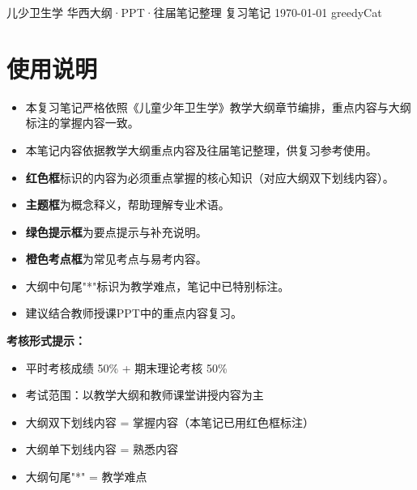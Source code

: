 \documentclass[10pt,a4paper,oneside]{ctexbook}
\begin{document}
\makecover
  {儿少卫生学}
  {华西大纲·PPT·往届笔记整理}
  {复习笔记}
  {\today}
  {greedyCat}

\tableofcontents

\chapter*{使用说明}

\begin{itemize}[leftmargin=*]
    \item 本复习笔记严格依照《儿童少年卫生学》教学大纲章节编排，重点内容与大纲标注的掌握内容一致。
    \item 本笔记内容依据教学大纲重点内容及往届笔记整理，供复习参考使用。
    \item \textbf{\color{keyred}红色框}标识的内容为必须重点掌握的核心知识（对应大纲双下划线内容）。
    \item \textbf{\color{main}主题框}为概念释义，帮助理解专业术语。
    \item \textbf{\color{darkgreen}绿色提示框}为要点提示与补充说明。
    \item \textbf{\color{orange}橙色考点框}为常见考点与易考内容。
    \item 大纲中句尾"*"标识为教学难点，笔记中已特别标注。
    \item 建议结合教师授课PPT中的重点内容复习。
\end{itemize}

\vspace{1cm}
\begin{center}
\begin{tcolorbox}[colback=yellow!10, colframe=yellow!80!black, boxrule=0.8pt, arc=6pt, width=0.85\textwidth, breakable]
\textbf{考核形式提示：}
\begin{itemize}[leftmargin=*]
    \item 平时考核成绩 50\% + 期末理论考核 50\%
    \item 考试范围：以教学大纲和教师课堂讲授内容为主
    \item 大纲双下划线内容 = 掌握内容（本笔记已用红色框标注）
    \item 大纲单下划线内容 = 熟悉内容
    \item 大纲句尾"*" = 教学难点
\end{itemize}
\end{tcolorbox}
\end{center}

\newpage
\end{document}
